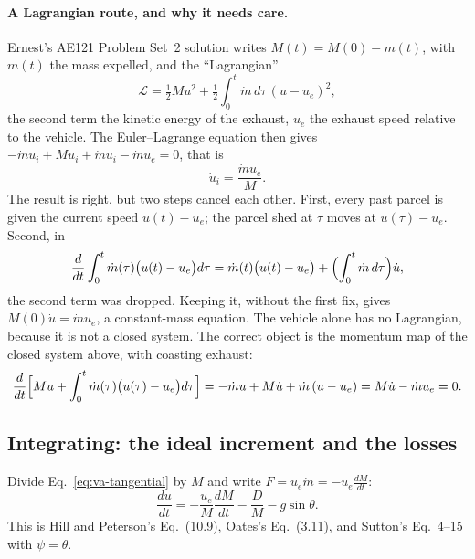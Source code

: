 \paragraph{A Lagrangian route, and why it needs care.} Ernest's AE121
Problem Set~2 solution writes $M(t)=M(0)-m(t)$, with $m(t)$ the mass
expelled, and the ``Lagrangian''
\[
 \mathcal L=\tfrac12Mu^2+\tfrac12\int_0^t\dot m\,d\tau\,(u-u_e)^2 ,
\]
the second term the kinetic energy of the exhaust, $u_e$ the exhaust speed
relative to the vehicle. The Euler--Lagrange equation then gives
$-\dot mu_i+M\dot u_i+\dot mu_i-\dot mu_e=0$, that is
\[
 \boxed{\dot u_i=\frac{\dot mu_e}{M}} .
\]
The result is right, but two steps cancel each other. First, every past
parcel is given the current speed $u(t)-u_e$; the parcel shed at $\tau$
moves at $u(\tau)-u_e$. Second, in
\[
 \frac{d}{dt}\int_0^t\dot m(\tau)\bigl(u(t)-u_e\bigr)d\tau
 =\dot m(t)\bigl(u(t)-u_e\bigr)+\Bigl(\int_0^t\dot m\,d\tau\Bigr)\dot u ,
\]
the second term was dropped. Keeping it, without the first fix, gives
$M(0)\dot u=\dot mu_e$, a constant-mass equation. The vehicle alone has no
Lagrangian, because it is not a closed system. The correct object is the
momentum map of the closed system above, with coasting exhaust:
\[
 \frac{d}{dt}\Bigl[Mu+\int_0^t\dot m(\tau)\bigl(u(\tau)-u_e\bigr)d\tau\Bigr]
 =-\dot mu+M\dot u+\dot m\,(u-u_e)=M\dot u-\dot mu_e=0 .
\]

\subsection{Integrating: the ideal increment and the losses}
\label{sec:va-integration}
Divide Eq.~\ref{eq:va-tangential} by $M$ and write
$F=u_e\dot m=-u_e\frac{dM}{dt}$:
\begin{equation}\label{eq:va-acceleration}
 \frac{du}{dt}=-\frac{u_e}{M}\frac{dM}{dt}-\frac{D}{M}-g\sin\theta .
\end{equation}
This is Hill and Peterson's Eq.~(10.9), Oates's Eq.~(3.11), and Sutton's
Eq.~4--15 with $\psi=\theta$.

